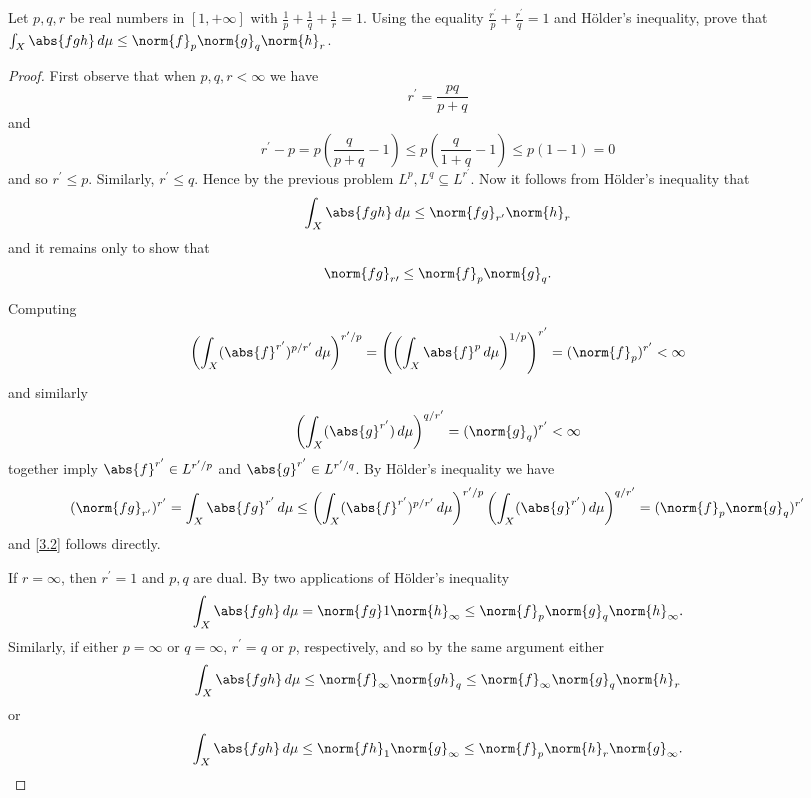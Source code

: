\documentclass[12pt]{amsart}
\begin{document}
\begin{thm}[p. 436, Problem 2]\label{ex3}
  Let $p, q, r$ be real numbers in $[1, +\infty]$ with $\frac{1}{p} + \frac{1}{q} + \frac{1}{r} = 1$.
  Using the equality $\frac{r^\prime}{p} + \frac{r^\prime}{q} = 1$ and H\"older's inequality, prove that $\int_X \abs{fgh}\, d\mu \leq \norm{f}_p\norm{g}_q\norm{h}_r$.
  
  \begin{proof}
    First observe that when $p, q, r < \infty$ we have 
    $$r^\prime = \frac{pq}{p + q}$$
    and 
    $$r^\prime - p = p(\frac{q}{p + q} - 1) \leq p(\frac{q}{1 + q} - 1) \leq p(1 - 1) = 0$$
    and so $r^\prime \leq p$.
    Similarly, $r^\prime \leq q$.
    Hence by the previous problem $L^p, L^q \subseteq L^{r^\prime}$.
    Now it follows from H\"older's inequality that
    \begin{equation}\label{3.1}
      \int_X \abs{fgh}\, d\mu \leq \norm{fg}_{r^\prime} \norm{h}_r
    \end{equation}
    and it remains only to show that 
    \begin{equation}\label{3.2}
      \norm{fg}_{r\prime} \leq \norm{f}_p\norm{g}_q.
    \end{equation}
    
    Computing
    $$\left(\int_X (\abs{f}^{r^\prime})^{p/r^\prime}\, d\mu\right)^{r^\prime/p} = \left(\left(\int_X \abs{f}^p\, d\mu\right)^{1/p}\right)^{r^\prime} = (\norm{f}_p)^{r^\prime} < \infty$$
    and similarly
    $$\left(\int_X (\abs{g}^{r^\prime})\, d\mu\right)^{q/r^\prime} = (\norm{g}_q)^{r^\prime} < \infty$$
    together imply $\abs{f}^{r^\prime} \in L^{r^\prime/p}$ and $\abs{g}^{r^\prime} \in L^{r^\prime/q}$.
    By H\"older's inequality we have
    $$(\norm{fg}_{r^\prime})^{r^\prime} = \int_X \abs{fg}^{r^\prime}\, d\mu \leq \left(\int_X (\abs{f}^{r^\prime})^{p/r^\prime}\, d\mu\right)^{r^\prime/p} \left(\int_X (\abs{g}^{r^\prime})\, d\mu\right)^{q/r^\prime} = (\norm{f}_p\norm{g}_q)^{r^\prime}$$
    and \eqref{3.2} follows directly.
    
    \newpage

    If $r = \infty$, then $r^\prime = 1$ and $p, q$ are dual.
    By two applications of H\"older's inequality
    $$\int_X \abs{fgh}\, d\mu = \norm{fg}1 \norm{h}_\infty \leq \norm{f}_p\norm{g}_q\norm{h}_\infty.$$
    Similarly, if either $p = \infty$ or $q = \infty$, $r^\prime = q$ or $p$, respectively, and so by the same argument either
    $$\int_X \abs{fgh}\, d\mu \leq \norm{f}_\infty \norm{gh}_q \leq \norm{f}_\infty \norm{g}_q \norm{h}_r$$
    or 
    $$\int_X \abs{fgh}\, d\mu \leq \norm{fh}_1 \norm{g}_\infty \leq \norm{f}_p \norm{h}_r \norm{g}_\infty.$$
  \end{proof}
\end{thm}
\end{document}
